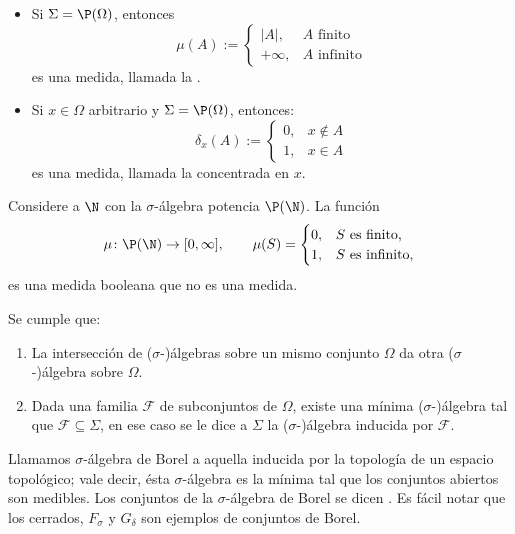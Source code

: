 \begin{ex}
	\begin{itemize}
		\item Si $\Sigma = \P(\Omega)$, entonces
			$$ \mu(A) := 
			\begin{cases}
				|A|, & A\text{ finito}\\
				+\infty, & A\text{ infinito}
			\end{cases} $$
			es una medida, llamada la .
		\item Si $x\in\Omega$ arbitrario y $\Sigma = \P(\Omega)$, entonces:
			$$ \delta_x(A) :=
			\begin{cases}
				0, & x\notin A \\
				1, & x\in A
			\end{cases} $$
			es una medida, llamada la  concentrada en $x$. 
	\end{itemize}
\end{ex}
\begin{ex}
	Considere a $\N$ con la $\sigma$-álgebra potencia $\P(\N)$.
	La función
	\[
		\mu \colon \P(\N) \to [0, \infty], \qquad \mu(S) =
		\begin{cases}
			0, & S \text{ es finito,} \\
			1, & S \text{ es infinito,}
		\end{cases}
	\]
	es una medida booleana que no es una medida.
\end{ex}


\begin{prop}
	Se cumple que:
	\begin{enumerate}
		\item La intersección de ($\sigma$-)álgebras sobre un mismo conjunto $\Omega$
			da otra ($\sigma$-)álgebra sobre $\Omega$.
		\item Dada una familia $\mathcal{F}$ de subconjuntos de $\Omega$, existe una mínima ($\sigma$-)álgebra tal que
			$\mathcal{F} \subseteq \Sigma$, en ese caso se le dice a $\Sigma$ la ($\sigma$-)álgebra inducida por $\mathcal{F}$.
	\end{enumerate}
\end{prop}
\begin{mydef}
	Llamamos $\sigma$-álgebra de Borel a aquella inducida por la topología de un espacio topológico;
	vale decir, ésta $\sigma$-álgebra es la mínima tal que los conjuntos abiertos son medibles.
	Los conjuntos de la $\sigma$-álgebra de Borel se dicen .
	Es fácil notar que los cerrados, $F_\sigma$ y $G_\delta$ son ejemplos de conjuntos de Borel.
\end{mydef}


